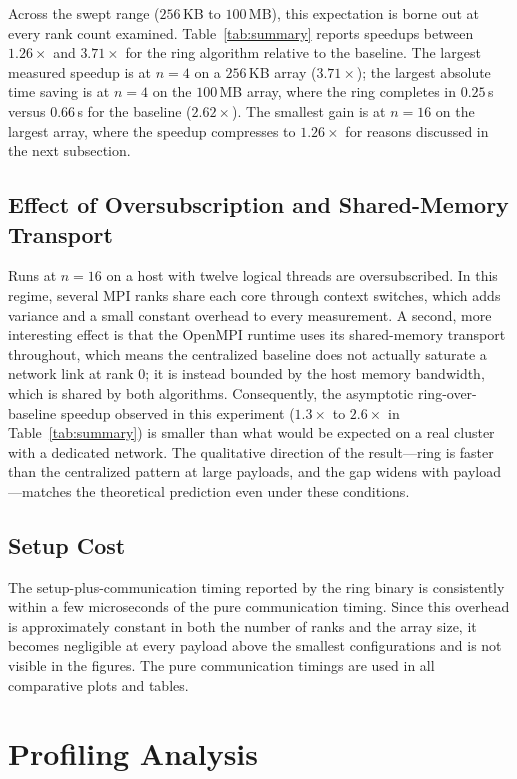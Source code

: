 \documentclass[12pt,a4paper]{article}
\begin{document}
Across the swept range ($256$\,KB to $100$\,MB), this expectation is borne out at every rank count examined. Table~\ref{tab:summary} reports speedups between $1.26\times$ and $3.71\times$ for the ring algorithm relative to the baseline. The largest measured speedup is at $n=4$ on a $256$\,KB array ($3.71\times$); the largest absolute time saving is at $n=4$ on the $100$\,MB array, where the ring completes in $0.25$\,s versus $0.66$\,s for the baseline ($2.62\times$). The smallest gain is at $n=16$ on the largest array, where the speedup compresses to $1.26\times$ for reasons discussed in the next subsection.

\subsection{Effect of Oversubscription and Shared-Memory Transport}

Runs at $n=16$ on a host with twelve logical threads are oversubscribed. In this regime, several MPI ranks share each core through context switches, which adds variance and a small constant overhead to every measurement. A second, more interesting effect is that the OpenMPI runtime uses its shared-memory transport throughout, which means the centralized baseline does not actually saturate a network link at rank 0; it is instead bounded by the host memory bandwidth, which is shared by both algorithms. Consequently, the asymptotic ring-over-baseline speedup observed in this experiment ($1.3\times$ to $2.6\times$ in Table~\ref{tab:summary}) is smaller than what would be expected on a real cluster with a dedicated network. The qualitative direction of the result---ring is faster than the centralized pattern at large payloads, and the gap widens with payload---matches the theoretical prediction even under these conditions.

\subsection{Setup Cost}

The setup-plus-communication timing reported by the ring binary is consistently within a few microseconds of the pure communication timing. Since this overhead is approximately constant in both the number of ranks and the array size, it becomes negligible at every payload above the smallest configurations and is not visible in the figures. The pure communication timings are used in all comparative plots and tables.

\section{Profiling Analysis}
\end{document}
